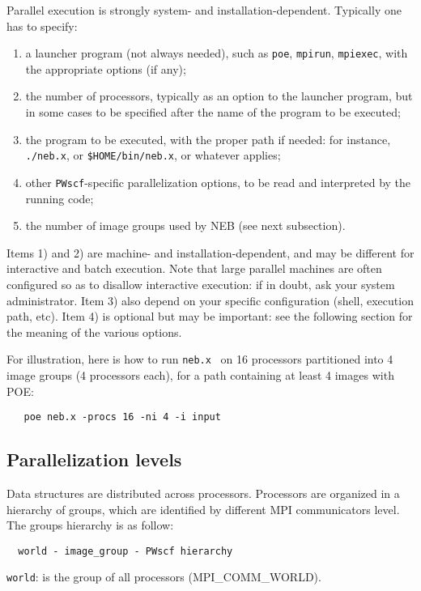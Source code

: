 \documentclass[12pt,a4paper]{article}
\begin{document}
Parallel execution is strongly system- and installation-dependent. 
Typically one has to specify:
\begin{enumerate}
\item a launcher program (not always needed), 
such as \texttt{poe}, \texttt{mpirun}, \texttt{mpiexec},
  with the  appropriate options (if any);
\item the number of processors, typically as an option to the launcher
  program, but in some cases to be specified after the name of the
  program to be
  executed; 
\item the program to be executed, with the proper path if needed: for
  instance, \texttt{./neb.x}, or \texttt{\$HOME/bin/neb.x}, or
  whatever applies; 
\item other \texttt{PWscf}-specific parallelization options, to be
  read and interpreted by the running code; 
\item the number of image groups used by NEB (see next subsection).
\end{enumerate}
Items 1) and 2) are machine- and installation-dependent, and may be 
different for interactive and batch execution. Note that large
parallel machines are  often configured so as to disallow interactive
execution: if in doubt, ask your system administrator.
Item 3) also depend on your specific configuration (shell, execution
path, etc). 
Item 4) is optional but may be important: see the following section
for the meaning of the various options.

For illustration, here is how to run \texttt{neb.x} \ on 16 processors partitioned into
4 image groups (4 processors each), for a path containing at least 4 images with POE:
\begin{verbatim}
   poe neb.x -procs 16 -ni 4 -i input
\end{verbatim}


\subsection{Parallelization levels}

Data structures are distributed across processors.
Processors are organized in a hierarchy of groups, 
which are identified by different MPI communicators level.
The groups hierarchy is as follow:
\begin{verbatim}
  world - image_group - PWscf hierarchy
\end{verbatim}

\texttt{world}: is the group of all processors (MPI\_COMM\_WORLD).
\end{document}
